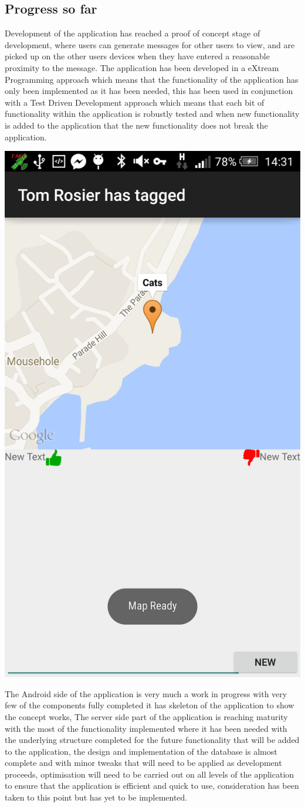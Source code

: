\documentclass[a0,landscape]{a0poster}
\begin{document}
\begin{multicols}{5}
\section{Progress so far}

Development of the application has reached a proof of concept stage of development, where users can generate messages for other users to view, and are picked up on the other users devices when they have entered a reasonable proximity to the message. The application has been developed in a eXtream Programming approach which means that the functionality of the application has only been implemented as it has been needed, this has been used in conjunction with a Test Driven Development approach which means that each bit of functionality within the application is robustly tested and when new functionality is added to the application that the new functionality does not break the application.\\

\begin{center}
\includegraphics[width=0.39\linewidth]{viewing}
\end{center}

The Android side of the application is very much a work in progress with very few of the components fully completed it has skeleton of the application to show the concept works, The server side part of the application is reaching maturity with the most of the functionality implemented where it has been needed with the underlying structure completed for the future functionality that will be added to the application, the design and implementation of the database is almost complete and with minor tweaks that will need to be applied as development proceeds, optimisation will need to be carried out on all levels of the application to ensure that the application is efficient and quick to use, consideration has been taken to this point but has yet to be implemented.


\end{multicols}
\end{document}

